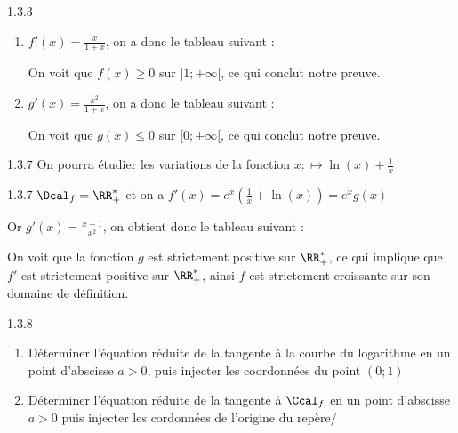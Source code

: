 \begin{Solution}{1.3.3}
	\begin{enumerate}
		\item $f'(x)=\frac{x}{1+x}$, on a donc le tableau suivant :\\
		
		On voit que $f(x)\geq0$ sur $]1;+\infty[$, ce qui conclut notre preuve.
		\item $g'(x)=\frac{x^2}{1+x}$, on a donc le tableau suivant :\\
		
		On voit que $g(x)\leq0$ sur $[0;+\infty[$, ce qui conclut notre preuve.
	\end{enumerate}
\end{Solution}
\begin{Indication}{1.3.7}
On pourra étudier les variations de la fonction $x:\mapsto\ln(x)+\frac{1}{x}$
\end{Indication}
\begin{Solution}{1.3.7}
	$\Dcal_f=\RR_+^*$ et on a $f'(x)=e^x\left(\frac{1}{x}+\ln(x)\right)=e^xg(x)$
	
	Or $g'(x)=\frac{x-1}{x^2}$, on obtient donc le tableau suivant :\\
	
	On voit que la fonction $g$ est strictement positive sur $\RR_+^*$, ce qui implique que $f'$ est strictement positive sur $\RR_+^*$, ainsi $f$ est strictement croissante sur son domaine de définition.
\end{Solution}
\begin{Indication}{1.3.8}
	\begin{enumerate}
		\item Déterminer l'équation réduite de la tangente à la courbe du logarithme en un point d'abscisse $a>0$, puis injecter les coordonnées du point $(0;1)$
		\item Déterminer l'équation réduite de la tangente à $\Ccal_f$ en un point d'abscisse $a>0$ puis injecter les cordonnées de l'origine du repère/
	\end{enumerate}
\end{Indication}
